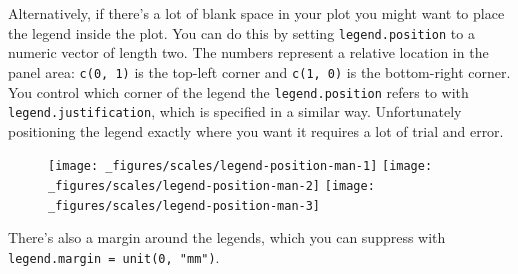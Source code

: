 Alternatively, if there's a lot of blank space in your plot you might
want to place the legend inside the plot. You can do this by setting
\texttt{legend.position} to a numeric vector of length two. The numbers
represent a relative location in the panel area: \texttt{c(0,\ 1)} is
the top-left corner and \texttt{c(1,\ 0)} is the bottom-right corner.
You control which corner of the legend the \texttt{legend.position}
refers to with \texttt{legend.justification}, which is specified in a
similar way. Unfortunately positioning the legend exactly where you want
it requires a lot of trial and error.

\begin{Shaded}
\begin{Highlighting}[]
\StringTok{ }\StringTok{ }
\StringTok{  }\NormalTok{(}\NormalTok{(}  \NormalTok{)}

\StringTok{ }\NormalTok{(} \NormalTok{(}\NormalTok{, }\NormalTok{), } \NormalTok{(}\NormalTok{, }\NormalTok{))}
\StringTok{ }\NormalTok{(} \NormalTok{(}\NormalTok{, }\NormalTok{), } \NormalTok{(}\NormalTok{, }\NormalTok{))}
\StringTok{ }\NormalTok{(} \NormalTok{(}\NormalTok{, }\NormalTok{), } \NormalTok{(}\NormalTok{, }\NormalTok{))}
\end{Highlighting}
\end{Shaded}

\begin{figure}[H]
  \texttt{[image: \_figures/scales/legend-position-man-1]}%
  \texttt{[image: \_figures/scales/legend-position-man-2]}%
  \texttt{[image: \_figures/scales/legend-position-man-3]}
\end{figure}

There's also a margin around the legends, which you can suppress with
\texttt{legend.margin\ =\ unit(0,\ "mm")}.

